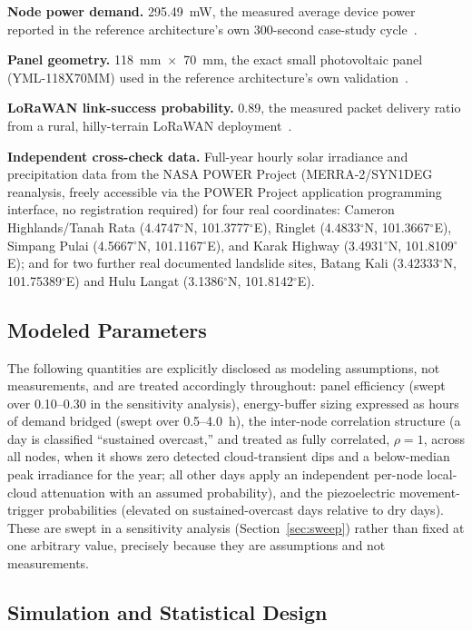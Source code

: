 \documentclass[electronics,article,submit,moreauthors]{Definitions/mdpi}
\begin{document}
\textbf{Node power demand.} 295.49~mW, the measured average device power reported in the reference architecture's own 300-second case-study cycle~\cite{ref101}.

\textbf{Panel geometry.} 118~mm~$\times$~70~mm, the exact small photovoltaic panel (YML-118X70MM) used in the reference architecture's own validation~\cite{ref101}.

\textbf{LoRaWAN link-success probability.} 0.89, the measured packet delivery ratio from a rural, hilly-terrain LoRaWAN deployment~\cite{ref92}.

\textbf{Independent cross-check data.} Full-year hourly solar irradiance and precipitation data from the NASA POWER Project (MERRA-2/SYN1DEG reanalysis, freely accessible via the POWER Project application programming interface, no registration required) for four real coordinates: Cameron Highlands/Tanah Rata (4.4747$^\circ$N, 101.3777$^\circ$E), Ringlet (4.4833$^\circ$N, 101.3667$^\circ$E), Simpang Pulai (4.5667$^\circ$N, 101.1167$^\circ$E), and Karak Highway (3.4931$^\circ$N, 101.8109$^\circ$E); and for two further real documented landslide sites, Batang Kali (3.42333$^\circ$N, 101.75389$^\circ$E) and Hulu Langat (3.1386$^\circ$N, 101.8142$^\circ$E).

\subsection{Modeled Parameters}

The following quantities are explicitly disclosed as modeling assumptions, not measurements, and are treated accordingly throughout: panel efficiency (swept over 0.10--0.30 in the sensitivity analysis), energy-buffer sizing expressed as hours of demand bridged (swept over 0.5--4.0~h), the inter-node correlation structure (a day is classified ``sustained overcast,'' and treated as fully correlated, $\rho=1$, across all nodes, when it shows zero detected cloud-transient dips and a below-median peak irradiance for the year; all other days apply an independent per-node local-cloud attenuation with an assumed probability), and the piezoelectric movement-trigger probabilities (elevated on sustained-overcast days relative to dry days). These are swept in a sensitivity analysis (Section~\ref{sec:sweep}) rather than fixed at one arbitrary value, precisely because they are assumptions and not measurements.

\subsection{Simulation and Statistical Design}
\end{document}
